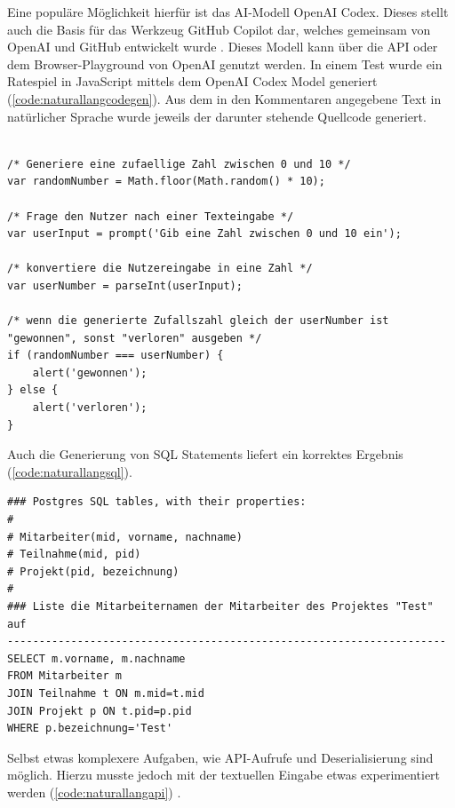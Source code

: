 Eine populäre Möglichkeit hierfür ist das AI-Modell OpenAI Codex. Dieses stellt auch die Basis für das Werkzeug GitHub Copilot dar, welches gemeinsam von OpenAI und GitHub entwickelt wurde \cite{openaicodex}.
Dieses Modell kann über die API oder dem Browser-Playground von OpenAI genutzt werden.
In einem Test wurde ein Ratespiel in JavaScript mittels dem OpenAI Codex Model generiert (\autoref{code:naturallangcodegen}). Aus dem in den Kommentaren angegebene Text in natürlicher Sprache wurde jeweils der darunter stehende Quellcode generiert.
\begin{lstlisting}[caption={Code aus natürlicher Sprache}, label=code:naturallangcodegen]

/* Generiere eine zufaellige Zahl zwischen 0 und 10 */
var randomNumber = Math.floor(Math.random() * 10);

/* Frage den Nutzer nach einer Texteingabe */
var userInput = prompt('Gib eine Zahl zwischen 0 und 10 ein');

/* konvertiere die Nutzereingabe in eine Zahl */
var userNumber = parseInt(userInput);

/* wenn die generierte Zufallszahl gleich der userNumber ist "gewonnen", sonst "verloren" ausgeben */
if (randomNumber === userNumber) {
	alert('gewonnen');
} else {
	alert('verloren');
}
\end{lstlisting}
\FloatBarrier
Auch die Generierung von SQL Statements liefert ein korrektes Ergebnis (\autoref{code:naturallangsql}).
\begin{lstlisting}[caption={SQL Statement aus natürlicher Sprache}, label=code:naturallangsql]
### Postgres SQL tables, with their properties:
#
# Mitarbeiter(mid, vorname, nachname)
# Teilnahme(mid, pid)
# Projekt(pid, bezeichnung)
#
### Liste die Mitarbeiternamen der Mitarbeiter des Projektes "Test" auf
---------------------------------------------------------------------
SELECT m.vorname, m.nachname
FROM Mitarbeiter m
JOIN Teilnahme t ON m.mid=t.mid
JOIN Projekt p ON t.pid=p.pid
WHERE p.bezeichnung='Test'
\end{lstlisting}
\FloatBarrier
Selbst etwas komplexere Aufgaben, wie API-Aufrufe und Deserialisierung sind möglich. Hierzu musste jedoch mit der textuellen Eingabe etwas experimentiert werden (\autoref{code:naturallangapi}) \cite{openaicodexsandbox}.
